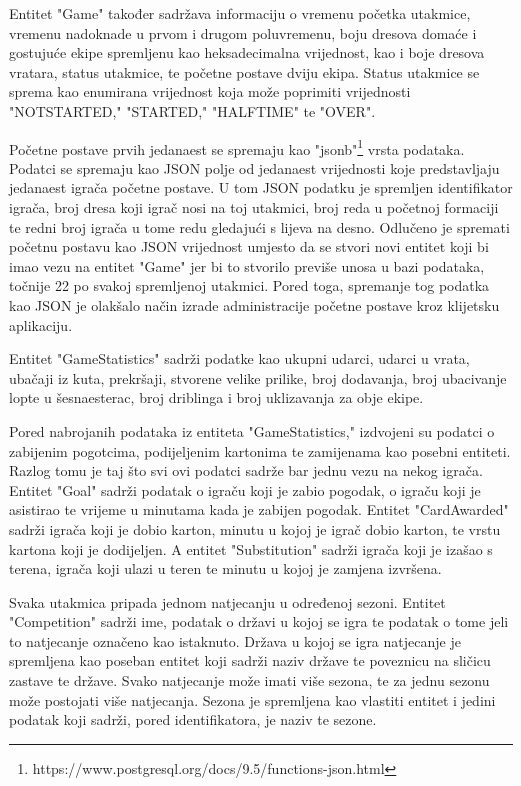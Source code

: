 \documentclass[times, utf8, zavrsni]{fer}
\begin{document}
Entitet "Game" također sadržava informaciju o vremenu početka utakmice, vremenu nadoknade u prvom i drugom poluvremenu, boju dresova domaće i gostujuće ekipe spremljenu kao heksadecimalna vrijednost,
kao i boje dresova vratara, status utakmice, te početne postave dviju ekipa.
Status utakmice se sprema kao enumirana vrijednost koja može poprimiti vrijednosti "NOT\textunderscore STARTED," "STARTED," "HALFTIME" te "OVER".

Početne postave prvih jedanaest se spremaju kao "jsonb"\footnote{https://www.postgresql.org/docs/9.5/functions-json.html} \citep{postgressjson} vrsta podataka.
Podatci se spremaju kao JSON polje od jedanaest vrijednosti koje predstavljaju jedanaest igrača početne postave. U tom JSON podatku je spremljen identifikator igrača, broj dresa koji igrač nosi na toj utakmici, broj reda u početnoj formaciji te redni broj igrača u tome redu gledajući s lijeva na desno.
Odlučeno je spremati početnu postavu kao JSON vrijednost umjesto da se stvori novi entitet koji bi imao vezu na entitet "Game" jer bi to stvorilo previše unosa u bazi podataka, točnije 22 po svakoj spremljenoj utakmici.
Pored toga, spremanje tog podatka kao JSON je olakšalo način izrade administracije početne postave kroz klijetsku aplikaciju.

Entitet "GameStatistics" sadrži podatke kao ukupni udarci, udarci u vrata, ubačaji iz kuta, prekršaji, stvorene velike prilike, broj dodavanja, broj ubacivanje lopte u šesnaesterac, broj driblinga i broj uklizavanja za obje ekipe.

Pored nabrojanih podataka iz entiteta "GameStatistics," izdvojeni su podatci o zabijenim pogotcima, podijeljenim kartonima te zamijenama kao posebni entiteti. Razlog tomu je taj što svi ovi podatci sadrže bar jednu vezu na nekog igrača.
Entitet "Goal" sadrži podatak o igraču koji je zabio pogodak, o igraču koji je asistirao te vrijeme u minutama kada je zabijen pogodak. Entitet "CardAwarded" sadrži igrača koji je dobio karton, minutu u kojoj je igrač dobio karton, te vrstu kartona koji je dodijeljen.
A entitet "Substitution" sadrži igrača koji je izašao s terena, igrača koji ulazi u teren te minutu u kojoj je zamjena izvršena.

Svaka utakmica pripada jednom natjecanju u određenoj sezoni. Entitet "Competition" sadrži ime, podatak o državi u kojoj se igra te podatak o tome jeli to natjecanje označeno kao istaknuto.
Država u kojoj se igra natjecanje je spremljena kao poseban entitet koji sadrži naziv države te poveznicu na sličicu zastave te države.
Svako natjecanje može imati više sezona, te za jednu sezonu može postojati više natjecanja. Sezona je spremljena kao vlastiti entitet i jedini podatak koji sadrži, pored identifikatora, je naziv te sezone.
\end{document}
